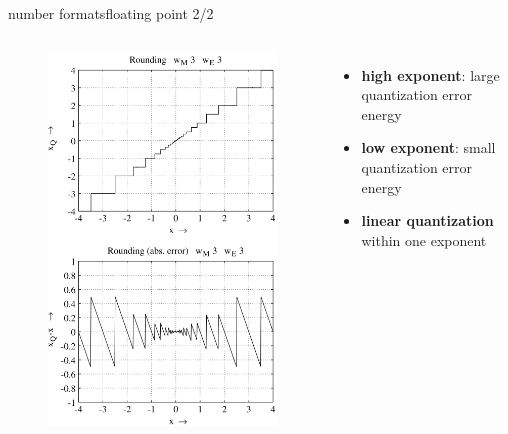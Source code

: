 	\begin{frame}{number formats}{floating point 2/2}
        \vspace{-5mm}
		\begin{columns}
			\column{5cm}
            \vspace{-3mm}
			\begin{figure}
				\centering
					\includegraphics[scale=0.35]{Graph/floatquanterror}
			\end{figure}
			
			\column{4cm}
			\pause
			\begin{itemize}
				\item	\textbf{high exponent}: large quantization error energy
				\item	\textbf{low exponent}: small quantization error energy
			    \pause
                \bigskip
                \item	\textbf{linear quantization} within one exponent
			\end{itemize}
		\end{columns}
	\end{frame}	

